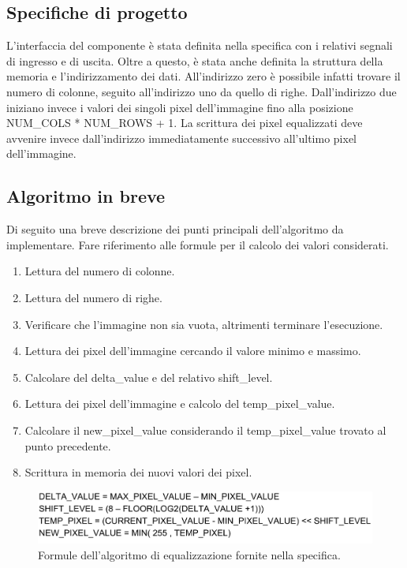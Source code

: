 \documentclass{article}
\begin{document}
\subsection{Specifiche di progetto}
L'interfaccia del componente è stata definita nella specifica con i relativi segnali di ingresso e di uscita. Oltre a questo, è stata anche definita la struttura della memoria e l'indirizzamento dei dati. All'indirizzo zero è possibile infatti trovare il numero di colonne, seguito all'indirizzo uno da quello di righe. Dall'indirizzo due iniziano invece i valori dei singoli pixel dell'immagine fino alla posizione NUM\_COLS * NUM\_ROWS + 1. La scrittura dei pixel equalizzati deve avvenire invece dall'indirizzo immediatamente successivo all'ultimo pixel dell'immagine.

\subsection{Algoritmo in breve}
Di seguito una breve descrizione dei punti principali dell'algoritmo da implementare. Fare riferimento alle formule per il calcolo dei valori considerati.

\begin{enumerate}
    \item Lettura del numero di colonne.
    \item Lettura del numero di righe.
    \item Verificare che l'immagine non sia vuota, altrimenti terminare l'esecuzione.
    \item Lettura dei pixel dell'immagine cercando il valore minimo e massimo.
    \item Calcolare del delta\_value e del relativo shift\_level.
    \item Lettura dei pixel dell'immagine e calcolo del temp\_pixel\_value.
    \item Calcolare il new\_pixel\_value considerando il temp\_pixel\_value trovato al punto precedente.
    \item Scrittura in memoria dei nuovi valori dei pixel.
\end{enumerate}

\begin{figure}[h]
    \includegraphics[width=\textwidth]{formulas.png}
    \centering
    \caption{Formule dell'algoritmo di equalizzazione fornite nella specifica.}
\end{figure}
\end{document}
